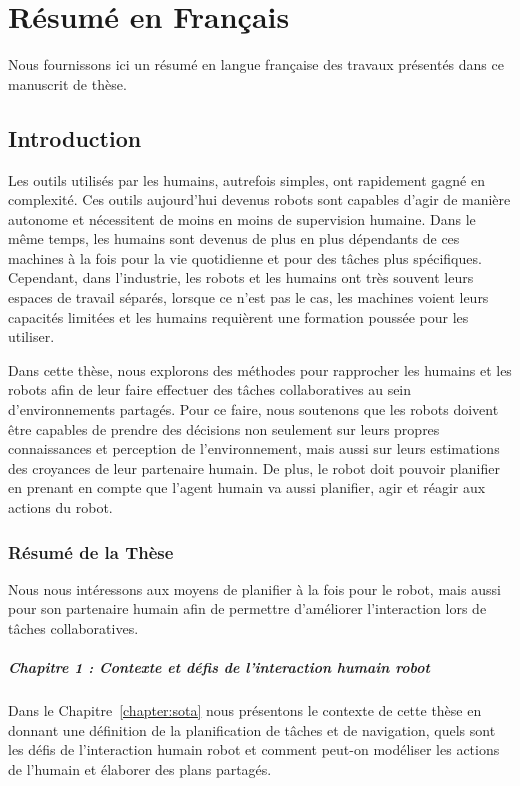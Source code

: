 \chapter{Résumé en Français}
\label{annex:frenchversion}
Nous fournissons ici un résumé en langue française des travaux présentés dans ce manuscrit de thèse.

\section{Introduction}
Les outils utilisés par les humains, autrefois simples, ont rapidement gagné en complexité. Ces outils aujourd'hui devenus robots sont capables d'agir de manière autonome et nécessitent de moins en moins de supervision humaine. Dans le même temps, les humains sont devenus de plus en plus dépendants de ces machines à la fois pour la vie quotidienne et pour des tâches plus spécifiques. Cependant, dans l'industrie, les robots et les humains ont très souvent leurs espaces de travail séparés, lorsque ce n'est pas le cas, les machines voient leurs capacités limitées et les humains requièrent une formation poussée pour les utiliser.

Dans cette thèse, nous explorons des méthodes pour rapprocher les humains et les robots afin de leur faire effectuer des tâches collaboratives au sein d’environnements partagés. Pour ce faire, nous soutenons que les robots doivent être capables de prendre des décisions non seulement sur leurs propres connaissances et perception de l’environnement, mais aussi sur leurs estimations des croyances de leur partenaire humain. De plus, le robot doit pouvoir planifier en prenant en compte que l'agent humain va aussi planifier, agir et réagir aux actions du robot.

\subsection{Résumé de la Thèse}
Nous nous intéressons aux moyens de planifier à la fois pour le robot, mais aussi pour son partenaire humain afin de permettre d'améliorer l'interaction lors de tâches collaboratives. 

\paragraph{Chapitre 1 : Contexte et défis de l'interaction humain robot}
Dans le Chapitre~\ref{chapter:sota} nous présentons le contexte de cette thèse en donnant une définition de la planification de tâches et de navigation, quels sont les défis de l'interaction humain robot et comment peut-on modéliser les actions de l'humain et élaborer des plans partagés. 

